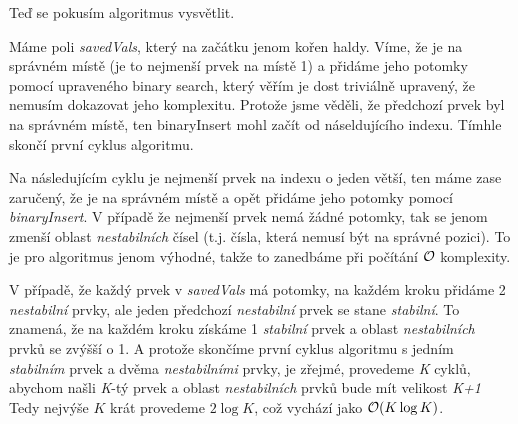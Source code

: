 \documentclass{../../../ksp}
\begin{document}
Teď se pokusím algoritmus vysvětlit.

Máme poli \emph{savedVals}, který na začátku jenom kořen haldy.
Víme, že je na správném místě (je to nejmenší prvek na místě 1) a přidáme jeho potomky pomocí upraveného binary search,
který věřím je dost triviálně upravený, že nemusím dokazovat jeho komplexitu.
Protože jsme věděli, že předchozí prvek byl na správném místě, ten binaryInsert mohl začít od náseldujícího indexu.
Tímhle skončí první cyklus algoritmu.

Na následujícím cyklu je nejmenší prvek na indexu o jeden větší, ten máme zase zaručený, že je na správném místě
a opět přidáme jeho potomky pomocí \emph{binaryInsert}.
V případě že nejmenší prvek nemá žádné potomky, tak se jenom zmenší oblast \emph{nestabilních} čísel (t.j. čísla, která nemusí být na správné pozici).
To je pro algoritmus jenom výhodné, takže to zanedbáme při počítání $\mathcal{O}$ komplexity.

V případě, že každý prvek v \emph{savedVals} má potomky, na každém kroku přidáme 2 \emph{nestabilní} prvky,
ale jeden předchozí \emph{nestabilní} prvek se stane \emph{stabilní}.
To znamená, že na každém kroku získáme 1 \emph{stabilní} prvek a oblast \emph{nestabilních} prvků se zvýšší o 1.
A protože skončíme první cyklus algoritmu s jedním \emph{stabilním} prvek a dvěma \emph{nestabilními} prvky,
je zřejmé, provedeme \emph{K} cyklů, abychom našli \emph{K}-tý prvek a oblast \emph{nestabilních} prvků bude mít velikost \emph{K+1}
Tedy nejvýše $K$ krát provedeme $2\log{K}$, což vychází jako $\mathcal{O}(K \log{K})$.
\end{document}

